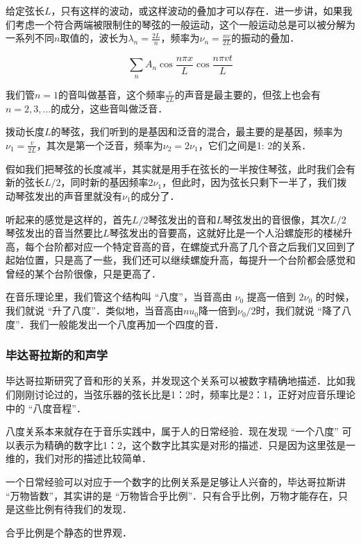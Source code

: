 给定弦长$L$，只有这样的波动，或这样波动的叠加才可以存在．进一步讲，如果我们考虑一个符合两端被限制住的琴弦的一般运动，这个一般运动总是可以被分解为一系列不同$n$取值的，波长为$\lambda_n = \frac{2L}{n}$，频率为$\nu_n = \frac{n v}{2 L }$的振动的叠加．

\begin{equation}
\sum\limits_{n} A_n \cos \frac{n \pi x}{L} \cos \frac{n \pi vt}{L}
\end{equation}

我们管$n = 1$的音叫做基音，这个频率$\frac{v}{2L}$的声音是最主要的，但弦上也会有$n= 2, 3, ...$的成分，这些音叫做泛音．

拨动长度$L$的琴弦，我们听到的是基因和泛音的混合，最主要的是基因，频率为$\nu_1 = \frac{v}{2L} $，其次是第一个泛音，频率为$\nu_2 = 2 \nu_1$，它们之间是1: 2的关系．

假如我们把琴弦的长度减半，其实就是用手在弦长的一半按住琴弦，此时我们会有新的弦长$L/2$，同时新的基因频率$2 \nu_1$，但此时，因为弦长只剩下一半了，我们拨动琴弦发出的声音里就没有$\nu_1$的成分了．

听起来的感觉是这样的，首先$L/2$琴弦发出的音和$L$琴弦发出的音很像，其次$L/2$琴弦发出的音当然要比$L$琴弦发出的音要高，这就好比是一个人沿螺旋形的楼梯升高，每个台阶都对应一个特定音高的音，在螺旋式升高了几个音之后我们又回到了起始位置，只是高了一些，我们还可以继续螺旋升高，每提升一个台阶都会感觉和曾经的某个台阶很像，只是更高了．

在音乐理论里，我们管这个结构叫 “八度”，当音高由 $\nu_0$ 提高一倍到 $2 \nu_0$ 的时候，我们就说 “升了八度”．类似地，当音高由$nu_0$降一倍到$\nu_0 /2$时，我们就说 “降了八度”．我们一般能发出一个八度再加一个四度的音．

\subsubsection{毕达哥拉斯的和声学}

毕达哥拉斯研究了音和形的关系，并发现这个关系可以被数字精确地描述．比如我们刚刚讨论过的，当弦乐器的弦长比是1：2时，频率比是2：1，正好对应音乐理论中的 “八度音程”．

八度关系本来就存在于音乐实践中，属于人的日常经验．现在发现 “一个八度” 可以表示为精确的数字比1：2，这个数字比其实是对形的描述．只是因为这里弦是一维的，我们对形的描述比较简单．

一个日常经验可以对应于一个数字的比例关系是足够让人兴奋的，毕达哥拉斯讲 “万物皆数”，其实讲的是 “万物皆合乎比例”．只有合乎比例，万物才能存在，只是这些比例有待我们的发现．

合乎比例是个静态的世界观．

